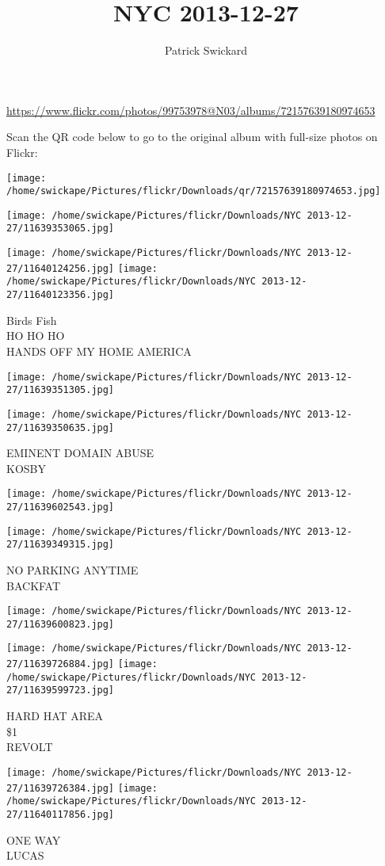 \documentclass[10pt,letterpaper]{article}
\title{NYC 2013-12-27}
\author{Patrick Swickard}
\date{}
\begin{document}
\maketitle

\url{https://www.flickr.com/photos/99753978@N03/albums/72157639180974653}

Scan the QR code below to go to the original album with full-size photos on Flickr:

\texttt{[image: /home/swickape/Pictures/flickr/Downloads/qr/72157639180974653.jpg]}
\pagebreak

\texttt{[image: /home/swickape/Pictures/flickr/Downloads/NYC 2013-12-27/11639353065.jpg]}

\vspace{0.25in}
\texttt{[image: /home/swickape/Pictures/flickr/Downloads/NYC 2013-12-27/11640124256.jpg]}
\texttt{[image: /home/swickape/Pictures/flickr/Downloads/NYC 2013-12-27/11640123356.jpg]}

Birds Fish\\
HO HO HO\\
HANDS OFF MY HOME AMERICA
\pagebreak

\texttt{[image: /home/swickape/Pictures/flickr/Downloads/NYC 2013-12-27/11639351305.jpg]}

\vspace{0.25in}
\texttt{[image: /home/swickape/Pictures/flickr/Downloads/NYC 2013-12-27/11639350635.jpg]}

EMINENT DOMAIN ABUSE\\
KOSBY
\pagebreak

\texttt{[image: /home/swickape/Pictures/flickr/Downloads/NYC 2013-12-27/11639602543.jpg]}

\vspace{0.25in}
\texttt{[image: /home/swickape/Pictures/flickr/Downloads/NYC 2013-12-27/11639349315.jpg]}

NO PARKING ANYTIME\\
BACKFAT
\pagebreak

\texttt{[image: /home/swickape/Pictures/flickr/Downloads/NYC 2013-12-27/11639600823.jpg]}

\vspace{0.25in}
\texttt{[image: /home/swickape/Pictures/flickr/Downloads/NYC 2013-12-27/11639726884.jpg]}
\texttt{[image: /home/swickape/Pictures/flickr/Downloads/NYC 2013-12-27/11639599723.jpg]}

HARD HAT AREA\\
\$1\\
REVOLT
\pagebreak

\texttt{[image: /home/swickape/Pictures/flickr/Downloads/NYC 2013-12-27/11639726384.jpg]}
\texttt{[image: /home/swickape/Pictures/flickr/Downloads/NYC 2013-12-27/11640117856.jpg]}

ONE WAY\\
LUCAS
\pagebreak
\end{document}
